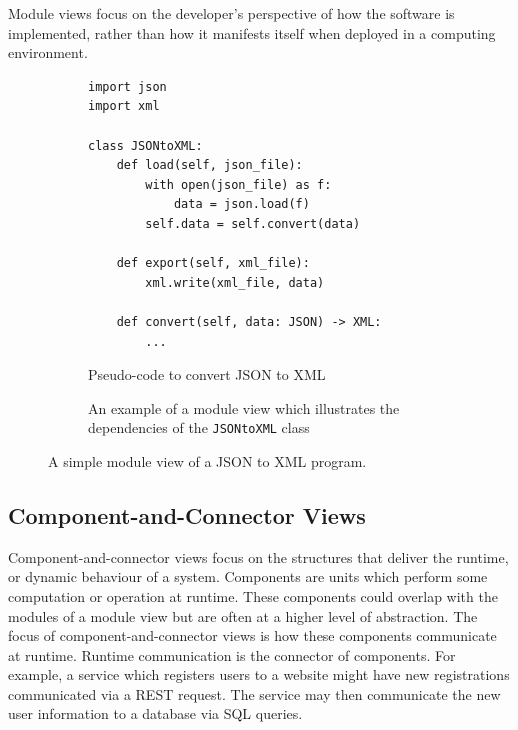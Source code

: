 Module views focus on the developer's perspective of how the software is implemented, rather than how it manifests itself when deployed in a computing environment.

\begin{figure}[ht]
\centering
\begin{subfigure}[b]{\textwidth}
\begin{shaded}
\begin{lstlisting}[style=python]
import json
import xml

class JSONtoXML:
    def load(self, json_file):
        with open(json_file) as f:
            data = json.load(f)
        self.data = self.convert(data)

    def export(self, xml_file):
        xml.write(xml_file, data)

    def convert(self, data: JSON) -> XML:
        ...
\end{lstlisting}
\end{shaded}
\caption{Pseudo-code to convert JSON to XML}
\end{subfigure}


\begin{subfigure}[b]{\textwidth}
\begin{center}
\end{center}
\caption{An example of a module view which illustrates the dependencies of the \texttt{JSONtoXML} class}
\end{subfigure}
\caption{A simple module view of a JSON to XML program.}
\end{figure}

\subsection{Component-and-Connector Views}
Component-and-connector views focus on the structures that deliver the runtime, or dynamic behaviour of a system.
Components are units which perform some computation or operation at runtime.
These components could overlap with the modules of a module view but are often at a higher level of abstraction.
The focus of component-and-connector views is how these components communicate at runtime.
Runtime communication is the connector of components.
For example, a service which registers users to a website might have new registrations communicated via a REST request.
The service may then communicate the new user information to a database via SQL queries.

